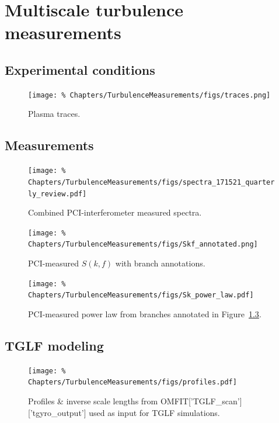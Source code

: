 \chapter{Multiscale turbulence measurements}
\label{ch:TurbulenceMeasurements}

\section{Experimental conditions}
\begin{figure}[h!]
  \centering
  \texttt{[image: \%
    Chapters/TurbulenceMeasurements/figs/traces.png]}
  \caption[Plasma traces]{%
    Plasma traces.
  }
\label{fig:TurbulenceMeasurements:traces}
\end{figure}
\section{Measurements}
\begin{figure}[h!]
  \centering
  \texttt{[image: \%
    Chapters/TurbulenceMeasurements/figs/spectra\_171521\_quarterly\_review.pdf]}
  \caption[Combined PCI-interferometer measured spectra]{%
    Combined PCI-interferometer measured spectra.
  }
\label{fig:TurbulenceMeasurements:spectra_quarterly_review}
\end{figure}

\begin{figure}[h!]
  \centering
  \texttt{[image: \%
    Chapters/TurbulenceMeasurements/figs/Skf\_annotated.png]}
  \caption[PCI-measured $S(k, f)$ with branch annotations]{%
    PCI-measured $S(k, f)$ with branch annotations.
  }
\label{fig:TurbulenceMeasurements:Skf_annotated}
\end{figure}

\begin{figure}[h!]
  \centering
  \texttt{[image: \%
    Chapters/TurbulenceMeasurements/figs/Sk\_power\_law.pdf]}
  \caption[PCI-measured power law]{%
    PCI-measured power law from branches annotated in
    Figure~\ref{fig:TurbulenceMeasurements:Skf_annotated}.
  }
\label{fig:TurbulenceMeasurements:Sk_power_law}
\end{figure}


\section{TGLF modeling}
\begin{figure}[h!]
  \centering
  \texttt{[image: \%
    Chapters/TurbulenceMeasurements/figs/profiles.pdf]}
  \caption[Profiles \& inverse scale lengths]{%
    Profiles \& inverse scale lengths from
    OMFIT['TGLF\_scan']['tgyro\_output']
    used as input for TGLF simulations.
  }
\label{fig:TurbulenceMeasurements:profiles}
\end{figure}

